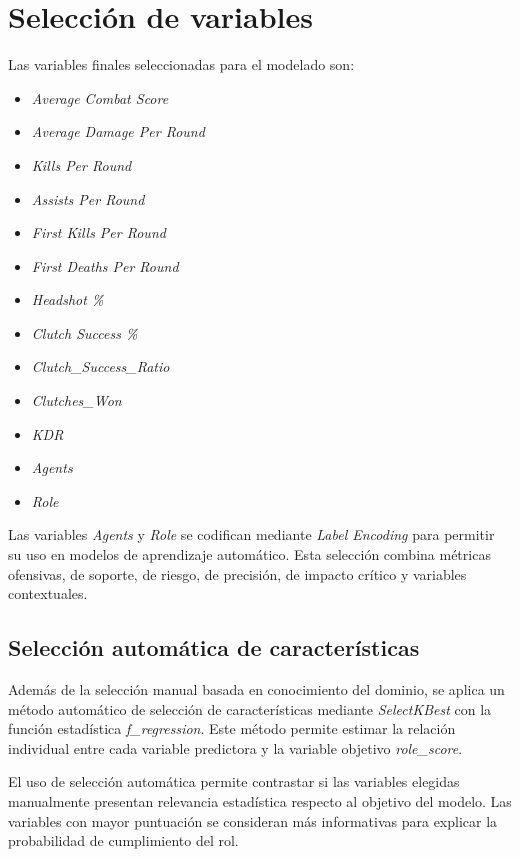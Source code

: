 \documentclass{ULBreport} %
\begin{document}
\section{Selección de variables}

Las variables finales seleccionadas para el modelado son:

\begin{itemize}
    \item \textit{Average Combat Score}
    \item \textit{Average Damage Per Round}
    \item \textit{Kills Per Round}
    \item \textit{Assists Per Round}
    \item \textit{First Kills Per Round}
    \item \textit{First Deaths Per Round}
    \item \textit{Headshot \%}
    \item \textit{Clutch Success \%}
    \item \textit{Clutch\_Success\_Ratio}
    \item \textit{Clutches\_Won}
    \item \textit{KDR}
    \item \textit{Agents}
    \item \textit{Role}
\end{itemize}

Las variables \textit{Agents} y \textit{Role} se codifican mediante \textit{Label Encoding} para permitir su uso en modelos de aprendizaje automático. Esta selección combina métricas ofensivas, de soporte, de riesgo, de precisión, de impacto crítico y variables contextuales.

\subsection{Selección automática de características}

Además de la selección manual basada en conocimiento del dominio, se aplica un método automático de selección de características mediante \textit{SelectKBest} con la función estadística \textit{f\_regression}. Este método permite estimar la relación individual entre cada variable predictora y la variable objetivo \textit{role\_score}.

El uso de selección automática permite contrastar si las variables elegidas manualmente presentan relevancia estadística respecto al objetivo del modelo. Las variables con mayor puntuación se consideran más informativas para explicar la probabilidad de cumplimiento del rol.
\end{document}
